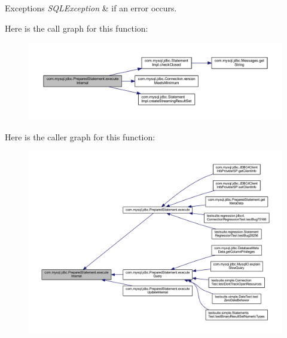 \begin{DoxyExceptions}{Exceptions}
{\em S\+Q\+L\+Exception} & if an error occurs. \\
\hline
\end{DoxyExceptions}
Here is the call graph for this function\+:
\nopagebreak
\begin{figure}[H]
\begin{center}
\leavevmode
\includegraphics[width=350pt]{classcom_1_1mysql_1_1jdbc_1_1_prepared_statement_a7d300759d88bba2536598e70808c3b6b_cgraph}
\end{center}
\end{figure}
Here is the caller graph for this function\+:
\nopagebreak
\begin{figure}[H]
\begin{center}
\leavevmode
\includegraphics[width=350pt]{classcom_1_1mysql_1_1jdbc_1_1_prepared_statement_a7d300759d88bba2536598e70808c3b6b_icgraph}
\end{center}
\end{figure}
\mbox{\label{classcom_1_1mysql_1_1jdbc_1_1_prepared_statement_a9db54f06b57ab9446798d306d59aeefc}} 
